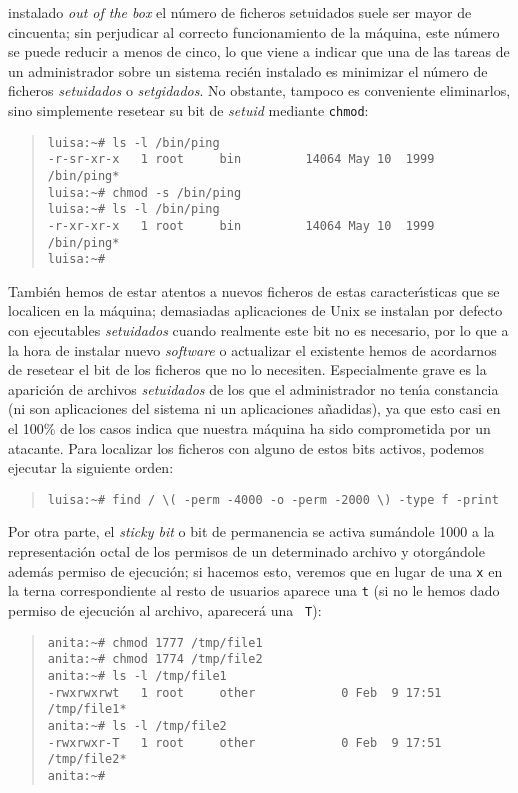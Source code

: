instalado {\it out of the box} el n\'umero de ficheros setuidados suele ser
mayor de cincuenta; sin perjudicar al correcto funcionamiento de la m\'aquina,
este n\'umero se puede reducir a menos de cinco, lo que viene a indicar que
una de las tareas de un administrador sobre un sistema reci\'en instalado es
minimizar el n\'umero de ficheros {\it setuidados} o {\it setgidados}. No
obstante, tampoco es conveniente eliminarlos, sino simplemente resetear su bit 
de {\it setuid} mediante {\tt chmod}:
\begin{quote}
\begin{verbatim}
luisa:~# ls -l /bin/ping 
-r-sr-xr-x   1 root     bin         14064 May 10  1999 /bin/ping*
luisa:~# chmod -s /bin/ping
luisa:~# ls -l /bin/ping 
-r-xr-xr-x   1 root     bin         14064 May 10  1999 /bin/ping*
luisa:~#
\end{verbatim}
\end{quote}
Tambi\'en hemos de estar atentos a nuevos ficheros de estas caracter\'{\i}sticas
que se localicen en la m\'aquina; demasiadas aplicaciones de Unix se instalan
por defecto con ejecutables {\it setuidados} cuando realmente este bit no es
necesario, por lo que a la hora de instalar nuevo {\it software} o actualizar
el existente hemos de acordarnos de resetear el bit de los ficheros que no lo 
necesiten. Especialmente grave es la aparici\'on de archivos {\it setuidados}
de los que el administrador no ten\'{\i}a constancia (ni son aplicaciones del
sistema ni un aplicaciones a\~nadidas), ya que esto casi en el 100\% de los
casos indica que nuestra m\'aquina ha sido comprometida por un atacante. Para 
localizar los ficheros con alguno de estos bits activos, podemos ejecutar la 
siguiente orden:
\begin{quote}
\begin{verbatim}
luisa:~# find / \( -perm -4000 -o -perm -2000 \) -type f -print
\end{verbatim}
\end{quote}
Por otra parte, el {\it sticky bit} o bit de permanencia se activa sum\'andole 
1000 a la 
representaci\'on octal de los permisos de un determinado archivo y otorg\'andole
adem\'as permiso de ejecuci\'on; si hacemos esto, veremos que en lugar de una 
{\tt x} en la terna correspondiente al resto de usuarios aparece una {\tt t} 
(si no le hemos dado permiso de ejecuci\'on al archivo, aparecer\'a una {\tt 
T}):
\begin{quote}
\begin{verbatim}
anita:~# chmod 1777 /tmp/file1
anita:~# chmod 1774 /tmp/file2
anita:~# ls -l /tmp/file1 
-rwxrwxrwt   1 root     other            0 Feb  9 17:51 /tmp/file1*
anita:~# ls -l /tmp/file2
-rwxrwxr-T   1 root     other            0 Feb  9 17:51 /tmp/file2*
anita:~# 
\end{verbatim}
\end{quote}
